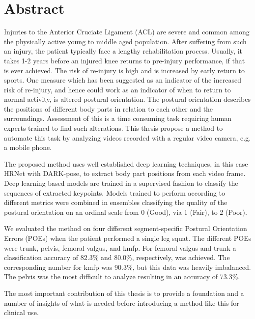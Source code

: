 \tableofcontents
\chapter*{Abstract}
Injuries to the Anterior Cruciate Ligament (ACL) are severe and common among the physically active young to middle aged population. After suffering from such an injury, the patient typically face a lengthy rehabilitation process. Usually, it takes 1-2 years before an injured knee returns to pre-injury performance, if that is ever achieved. The risk of re-injury is high and is increased by early return to sports. One measure which has been suggested as an indicator of the increased risk of re-injury, and hence could work as an indicator of when to return to normal activity, is altered postural orientation. The postural orientation describes the positions of different body parts in relation to each other and the surroundings. Assessment of this is a time consuming task requiring human experts trained to find such alterations. This thesis propose a method to automate this task by analyzing videos recorded with a regular video camera, e.g. a mobile phone.

The proposed method uses well established deep learning techniques, in this case HRNet with DARK-pose, to extract body part positions from each video frame. Deep learning based models are trained in a supervised fashion to classify the sequences of extracted keypoints. Models trained to perform according to different metrics were combined in ensembles classifying the quality of the postural orientation on an ordinal scale from 0 (Good), via 1 (Fair), to 2 (Poor).

We evaluated the method on four different segment-specific Postural Orientation Errors (POEs) when the patient performed a single leg squat. The different POEs were trunk, pelvis, femoral valgus, and \gls{kmfp}. For femoral valgus and trunk a classification accuracy of 82.3\% and 80.0\%, respectively, was achieved. The corresponding number for \gls{kmfp} was 90.3\%, but this data was heavily imbalanced. The pelvis was the most difficult to analyze resulting in an accuracy of 73.3\%.

The most important contribution of this thesis is to provide a foundation and a number of insights of what is needed before introducing a method like this for clinical use.


